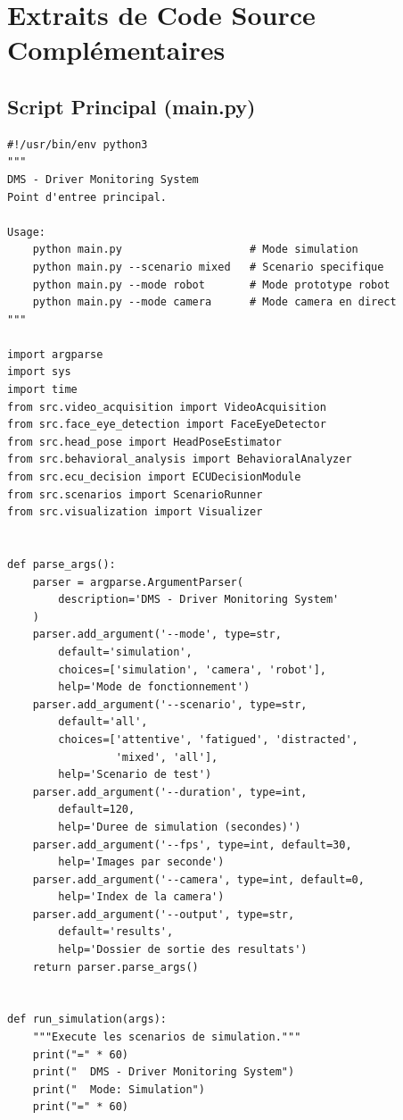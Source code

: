\documentclass[12pt,a4paper,twoside]{report}
\begin{document}
\chapter{Extraits de Code Source Complémentaires}

\section{Script Principal (main.py)}

\begin{lstlisting}[style=pythonstyle, caption={Point d'entrée principal du système DMS.}, label={lst:main}]
#!/usr/bin/env python3
"""
DMS - Driver Monitoring System
Point d'entree principal.

Usage:
    python main.py                    # Mode simulation
    python main.py --scenario mixed   # Scenario specifique
    python main.py --mode robot       # Mode prototype robot
    python main.py --mode camera      # Mode camera en direct
"""

import argparse
import sys
import time
from src.video_acquisition import VideoAcquisition
from src.face_eye_detection import FaceEyeDetector
from src.head_pose import HeadPoseEstimator
from src.behavioral_analysis import BehavioralAnalyzer
from src.ecu_decision import ECUDecisionModule
from src.scenarios import ScenarioRunner
from src.visualization import Visualizer


def parse_args():
    parser = argparse.ArgumentParser(
        description='DMS - Driver Monitoring System'
    )
    parser.add_argument('--mode', type=str, 
        default='simulation',
        choices=['simulation', 'camera', 'robot'],
        help='Mode de fonctionnement')
    parser.add_argument('--scenario', type=str,
        default='all',
        choices=['attentive', 'fatigued', 'distracted', 
                 'mixed', 'all'],
        help='Scenario de test')
    parser.add_argument('--duration', type=int, 
        default=120,
        help='Duree de simulation (secondes)')
    parser.add_argument('--fps', type=int, default=30,
        help='Images par seconde')
    parser.add_argument('--camera', type=int, default=0,
        help='Index de la camera')
    parser.add_argument('--output', type=str, 
        default='results',
        help='Dossier de sortie des resultats')
    return parser.parse_args()


def run_simulation(args):
    """Execute les scenarios de simulation."""
    print("=" * 60)
    print("  DMS - Driver Monitoring System")
    print("  Mode: Simulation")
    print("=" * 60)
    

\end{lstlisting}
\end{document}
